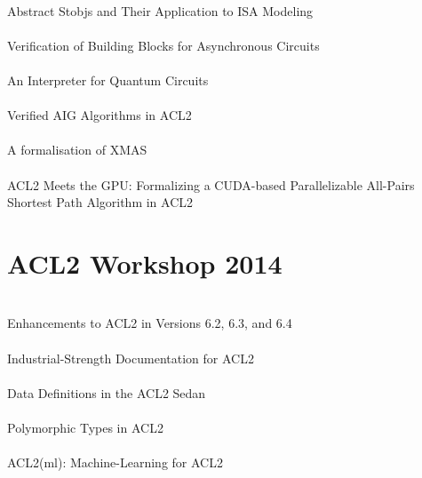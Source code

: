 \documentclass{article}
\begin{document}
\cite{13-goel-absstobj} \\
Abstract Stobjs and Their Application to {ISA} Modeling \\

\cite{13-verbeek-async} \\
Verification of Building Blocks for Asynchronous Circuits \\

\cite{13-helms-quantum} \\
An Interpreter for Quantum Circuits \\

\cite{13-davis-aig} \\
Verified {AIG} Algorithms in {ACL2} \\

\cite{13-van-gastel-xmas} \\
A formalisation of {XMAS} \\

\cite{13-hardin-cuda} \\
{ACL2} Meets the {GPU}: Formalizing a {CUDA}-based Parallelizable All-Pairs Shortest Path Algorithm in {ACL2} \\


\section{ACL2 Workshop 2014}

\cite{14-kaufmann-enhancements} \\
Enhancements to {ACL2} in Versions 6.2, 6.3, and 6.4 \\

\cite{14-davis-xdoc} \\
Industrial-Strength Documentation for {ACL2} \\

\cite{14-chamarthi-defdata} \\
Data Definitions in the {ACL2 Sedan} \\

\cite{14-selfridge-polymorphic} \\
Polymorphic Types in {ACL2} \\

\cite{14-heras-ml} \\
{ACL2(ml)}: Machine-Learning for {ACL2} \\
\end{document}
